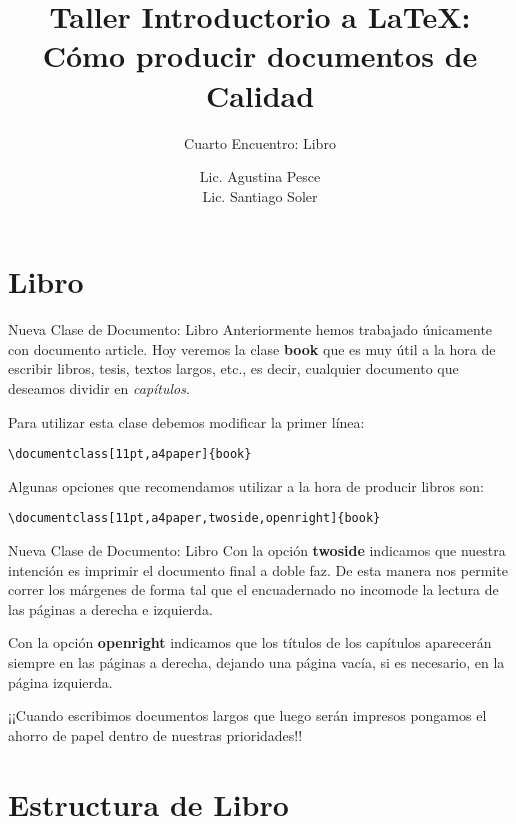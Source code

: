 \documentclass[11pt]{beamer}
\author{Lic. Agustina Pesce \\ Lic. Santiago Soler}
\title[Taller de {\LaTeX}]{Taller Introductorio a {\LaTeX}: \\ Cómo producir documentos de Calidad}
\subtitle{Cuarto Encuentro: Libro}
\date{}
\begin{document}
\maketitle


\section{Libro}

\begin{frame}[fragile]{Nueva Clase de Documento: Libro}
Anteriormente hemos trabajado únicamente con documento article. Hoy veremos la clase \textbf{book} que es muy útil a la hora de escribir libros, tesis, textos largos, etc., es decir, cualquier documento que deseamos dividir en \emph{capítulos}.

Para utilizar esta clase debemos modificar la primer línea:
{\color{new_green}
\begin{verbatim}
\documentclass[11pt,a4paper]{book}
\end{verbatim}
}

Algunas opciones que recomendamos utilizar a la hora de producir libros son:
{\color{new_green}
\begin{verbatim}
\documentclass[11pt,a4paper,twoside,openright]{book}
\end{verbatim}
}
\end{frame}


\begin{frame}[fragile]{Nueva Clase de Documento: Libro}
Con la opción \textbf{twoside} indicamos que nuestra intención es imprimir el documento final a doble faz. De esta manera nos permite correr los márgenes de forma tal que el encuadernado no incomode la lectura de las páginas a derecha e izquierda.

Con la opción \textbf{openright} indicamos que los títulos de los capítulos aparecerán siempre en las páginas a derecha, dejando una página vacía, si es necesario, en la página izquierda.

\begin{block}{}
¡¡Cuando escribimos documentos largos que luego serán impresos pongamos el ahorro de papel dentro de nuestras prioridades!!
\end{block}
\end{frame}


\section{Estructura de Libro}
\end{document}
